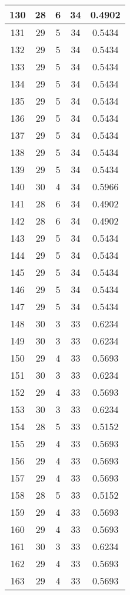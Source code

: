\documentclass[letterpaper, 12pt]{article}
\begin{document}
\begin{longtable}{|c|c|c|c|c|}
\hline
130 & 28 & 6 & 34 & 0.4902 \\
\hline
131 & 29 & 5 & 34 & 0.5434 \\
\hline
132 & 29 & 5 & 34 & 0.5434 \\
\hline
133 & 29 & 5 & 34 & 0.5434 \\
\hline
134 & 29 & 5 & 34 & 0.5434 \\
\hline
135 & 29 & 5 & 34 & 0.5434 \\
\hline
136 & 29 & 5 & 34 & 0.5434 \\
\hline
137 & 29 & 5 & 34 & 0.5434 \\
\hline
138 & 29 & 5 & 34 & 0.5434 \\
\hline
139 & 29 & 5 & 34 & 0.5434 \\
\hline
140 & 30 & 4 & 34 & 0.5966 \\
\hline
141 & 28 & 6 & 34 & 0.4902 \\
\hline
142 & 28 & 6 & 34 & 0.4902 \\
\hline
143 & 29 & 5 & 34 & 0.5434 \\
\hline
144 & 29 & 5 & 34 & 0.5434 \\
\hline
145 & 29 & 5 & 34 & 0.5434 \\
\hline
146 & 29 & 5 & 34 & 0.5434 \\
\hline
147 & 29 & 5 & 34 & 0.5434 \\
\hline
148 & 30 & 3 & 33 & 0.6234 \\
\hline
149 & 30 & 3 & 33 & 0.6234 \\
\hline
150 & 29 & 4 & 33 & 0.5693 \\
\hline
151 & 30 & 3 & 33 & 0.6234 \\
\hline
152 & 29 & 4 & 33 & 0.5693 \\
\hline
153 & 30 & 3 & 33 & 0.6234 \\
\hline
154 & 28 & 5 & 33 & 0.5152 \\
\hline
155 & 29 & 4 & 33 & 0.5693 \\
\hline
156 & 29 & 4 & 33 & 0.5693 \\
\hline
157 & 29 & 4 & 33 & 0.5693 \\
\hline
158 & 28 & 5 & 33 & 0.5152 \\
\hline
159 & 29 & 4 & 33 & 0.5693 \\
\hline
160 & 29 & 4 & 33 & 0.5693 \\
\hline
161 & 30 & 3 & 33 & 0.6234 \\
\hline
162 & 29 & 4 & 33 & 0.5693 \\
\hline
163 & 29 & 4 & 33 & 0.5693 \\

\end{longtable}
\end{document}
